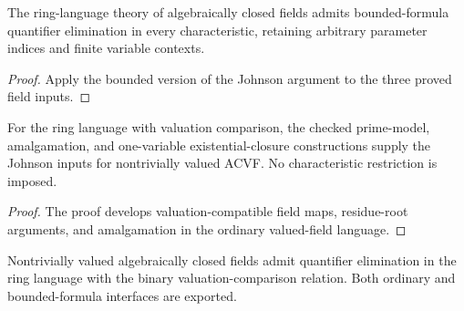 \begin{theorem}

\label{acf}


\leanok

The ring-language theory of algebraically closed fields admits bounded-formula
quantifier elimination in every characteristic, retaining arbitrary parameter
indices and finite variable contexts.

\end{theorem}

\begin{proof}


\leanok

Apply the bounded version of the Johnson argument to the three proved
field inputs.

\end{proof}

\begin{lemma}

\label{valued-inputs}


\leanok

For the ring language with valuation comparison, the checked prime-model,
amalgamation, and one-variable existential-closure constructions supply the
Johnson inputs for nontrivially valued ACVF. No characteristic restriction is imposed.

\end{lemma}

\begin{proof}

\leanok

The proof develops valuation-compatible field maps, residue-root arguments,
and amalgamation in the ordinary valued-field language.

\end{proof}

\begin{theorem}

\label{ordinary}


\leanok

Nontrivially valued algebraically closed fields admit quantifier elimination
in the ring language with the binary valuation-comparison relation.
Both ordinary and bounded-formula interfaces are exported.

\end{theorem}

